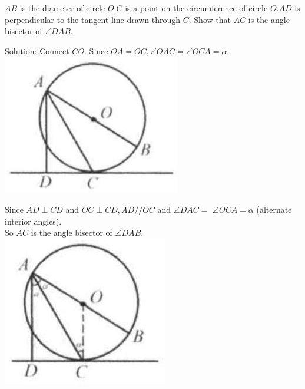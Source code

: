 \documentclass{article}
\begin{document}
\(A B\) is the diameter of circle \(O . C\) is a point on the circumference of circle \(O . A D\) is perpendicular to the tangent line drawn through \(C\). Show that \(A C\) is the angle bisector of \(\angle D A B\).

Solution:
Connect \(C O\). Since \(O A=O C, \angle O A C=\angle O C A=\alpha\).\\
\centering
\includegraphics[width=\textwidth]{images/148(4).jpg}

Since \(A D \perp C D\) and \(O C \perp C D, A D / / O C\) and \(\angle D A C=\) \(\angle O C A=\alpha\) (alternate interior angles).\\
So \(A C\) is the angle bisector of \(\angle D A B\).\\
\centering
\includegraphics[width=\textwidth]{images/148(1).jpg}
\end{document}
